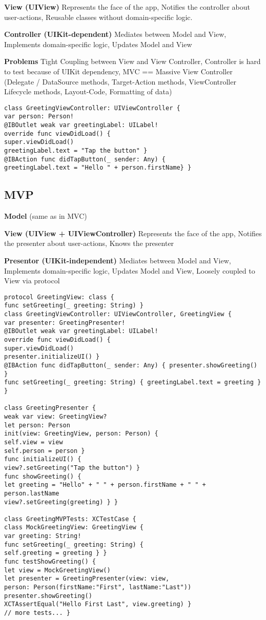 \textbf{View (UIView)}
Represents the face of the app,
Notifies the controller about user-actions,
Reusable classes without domain-specific logic.

\textbf{Controller (UIKit-dependent)}
Mediates between Model and View,
Implements domain-specific logic,
Updates Model and View

\textbf{Problems}
Tight Coupling between View and View Controller,
Controller is hard to test because of UIKit dependency,
MVC == Massive View Controller (Delegate / DataSource methods, Target-Action
methods, ViewController Lifecycle methods, Layout-Code, Formatting of data)

\begin{lstlisting}
class GreetingViewController: UIViewController {
var person: Person!
@IBOutlet weak var greetingLabel: UILabel!
override func viewDidLoad() {
super.viewDidLoad()
greetingLabel.text = "Tap the button" }
@IBAction func didTapButton(_ sender: Any) {
greetingLabel.text = "Hello " + person.firstName} }
\end{lstlisting}

\subsection{MVP}
\textbf{Model} (same as in MVC)

\textbf{View (UIView + UIViewController)}
Represents the face of the app,
Notifies the presenter about user-actions,
Knows the presenter

\textbf{Presentor (UIKit-independent)}
Mediates between Model and View,
Implements domain-specific logic,
Updates Model and View,
Loosely coupled to View via protocol

\begin{lstlisting}
protocol GreetingView: class {
func setGreeting(_ greeting: String) }
class GreetingViewController: UIViewController, GreetingView {
var presenter: GreetingPresenter!
@IBOutlet weak var greetingLabel: UILabel!
override func viewDidLoad() {
super.viewDidLoad()
presenter.initializeUI() }
@IBAction func didTapButton(_ sender: Any) { presenter.showGreeting() }
func setGreeting(_ greeting: String) { greetingLabel.text = greeting } }

class GreetingPresenter {
weak var view: GreetingView?
let person: Person
init(view: GreetingView, person: Person) {
self.view = view
self.person = person }
func initializeUI() {
view?.setGreeting("Tap the button") }
func showGreeting() {
let greeting = "Hello" + " " + person.firstName + " " + person.lastName
view?.setGreeting(greeting) } }

class GreetingMVPTests: XCTestCase {
class MockGreetingView: GreetingView {
var greeting: String!
func setGreeting(_ greeting: String) {
self.greeting = greeting } }
func testShowGreeting() {
let view = MockGreetingView()
let presenter = GreetingPresenter(view: view,
person: Person(firstName:"First", lastName:"Last"))
presenter.showGreeting()
XCTAssertEqual("Hello First Last", view.greeting) }
// more tests... }
\end{lstlisting}

